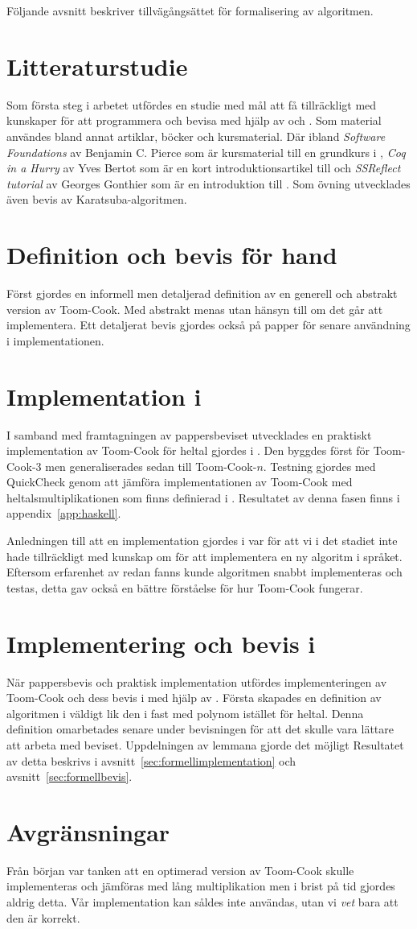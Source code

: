 Följande avsnitt beskriver tillvägångsättet för formalisering av algoritmen.

\section{Litteraturstudie}
Som första steg i arbetet utfördes en studie med mål att få tillräckligt med
kunskaper för att programmera och bevisa med hjälp av \coq{} och \ssr{}. Som
material användes bland annat artiklar, böcker och kursmaterial. Där ibland
\emph{Software Foundations} av Benjamin C. Pierce som är kursmaterial till en
grundkurs i \coq{}, \emph{Coq in a Hurry} av Yves Bertot som är en kort
introduktionsartikel till \coq{} och \emph{SSReflect tutorial} av Georges
Gonthier som är en introduktion till \ssr{}. Som övning utvecklades även bevis av
Karatsuba-algoritmen.

\section{Definition och bevis för hand}
Först gjordes en informell men detaljerad definition av en generell och
abstrakt version av Toom-Cook. Med abstrakt menas utan hänsyn till om det går
att implementera. Ett detaljerat bevis gjordes också på papper för senare
användning i implementationen.

\section{Implementation i \haskell{}}
I samband med framtagningen av pappersbeviset utvecklades en praktiskt
implementation av Toom-Cook för heltal gjordes i \haskell{}. Den byggdes först för
Toom-Cook-3 men generaliserades sedan till Toom-Cook-$n$. Testning gjordes med
QuickCheck genom att jämföra implementationen av Toom-Cook med
heltalsmultiplikationen som finns definierad i \haskell{}. Resultatet av denna
fasen finns i appendix~\ref{app:haskell}.

Anledningen till att en implementation gjordes i \haskell{} var för att vi i det
stadiet inte hade tillräckligt med kunskap om \coq{} för att implementera en ny
algoritm i språket. Eftersom erfarenhet av \haskell{} redan fanns kunde algoritmen
snabbt implementeras och testas, detta gav också en bättre förståelse för hur
Toom-Cook fungerar.

\section{Implementering och bevis i \coq{}}
När pappersbevis och praktisk implementation utfördes implementeringen av
Toom-Cook och dess bevis i \coq{} med hjälp av \ssr{}. Första skapades en
definition av algoritmen i \coq{} väldigt lik den i \haskell{} fast med polynom
istället för heltal. Denna definition omarbetades senare under bevisningen för
att det skulle vara lättare att arbeta med beviset. Uppdelningen av lemmana
gjorde det möjligt Resultatet av detta
beskrivs i avsnitt~\ref{sec:formellimplementation} och
avsnitt~\ref{sec:formellbevis}.

\section{Avgränsningar}
Från början var tanken att en optimerad version av Toom-Cook skulle
implementeras och jämföras med lång multiplikation men i brist på tid gjordes
aldrig detta. Vår implementation kan såldes inte användas, utan vi \emph{vet}
bara att den är korrekt.
